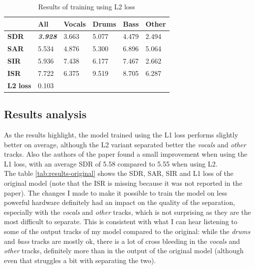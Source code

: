 \documentclass[12pt]{article}
\begin{document}
\begin{table}[h]
\centering
\begin{tabular}{l|l|llll}
                 & \textbf{All}            & \multicolumn{1}{l|}{\textbf{Vocals}} & \multicolumn{1}{l|}{\textbf{Drums}} & \multicolumn{1}{l|}{\textbf{Bass}} & \textbf{Other} \\ \hline
\textbf{SDR}     & \textit{\textbf{3.928}} & \multicolumn{1}{l|}{3.663}           & \multicolumn{1}{l|}{5.077}          & \multicolumn{1}{l|}{4.479}         & 2.494          \\ \hline
\textbf{SAR}     & 5.534                   & \multicolumn{1}{l|}{4.876}           & \multicolumn{1}{l|}{5.300}          & \multicolumn{1}{l|}{6.896}         & 5.064          \\ \hline
\textbf{SIR}     & 5.936                   & \multicolumn{1}{l|}{7.438}           & \multicolumn{1}{l|}{6.177}          & \multicolumn{1}{l|}{7.467}         & 2.662          \\ \hline
\textbf{ISR}     & 7.722                   & \multicolumn{1}{l|}{6.375}           & \multicolumn{1}{l|}{9.519}          & \multicolumn{1}{l|}{8.705}         & 6.287          \\ \hline
\textbf{L2 loss} & 0.103                   &                                      &                                     &                                    &               
\end{tabular}
\caption{Results of training using L2 loss}
\label{tab:results2}
\end{table}




\subsection{Results analysis}
As the results highlight, the model trained using the L1 loss performs slightly better on average, although the L2 variant separated better the \textit{vocals} and \textit{other} tracks. Also the authors of the paper found a small improvement when using the L1 loss, with an average SDR of 5.58 compared to 5.55 when using L2. \\
The table \ref{tab:results-original} shows the SDR, SAR, SIR and L1 loss of the original model (note that the ISR is missing because it was not reported in the paper). The changes I made to make it possible to train the model on less powerful hardware definitely had an impact on the quality of the separation, especially with the \textit{vocals} and \textit{other} tracks, which is not surprising as they are the most difficult to separate. This is consistent with what I can hear listening to some of the output tracks of my model compared to the original: while the \textit{drums} and \textit{bass} tracks are mostly ok, there is a lot of cross bleeding in the \textit{vocals} and \textit{other} tracks, definitely more than in the output of the original model (although even that struggles a bit with separating the two).
\end{document}
